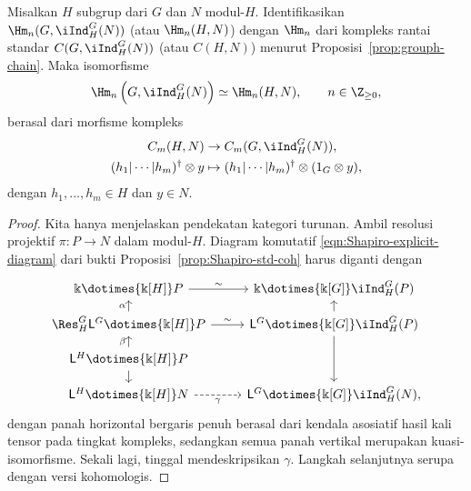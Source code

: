 \begin{proposition}\label{prop:Shapiro-std-ho}
	Misalkan $H$ subgrup dari $G$ dan $N$ modul-$H$. Identifikasikan
	$\Hm_n(G,\iInd^G_H(N))$ (atau $\Hm_n(H,N)$) dengan $\Hm_n$ dari kompleks
	rantai standar $C(G,\iInd^G_H(N))$ (atau $C(H,N)$) menurut
	Proposisi~\ref{prop:grouph-chain}. Maka isomorfisme
	\[ \Hm_n\left(G,\iInd^G_H(N)\right)\simeq\Hm_n(H,N),
	\qquad n\in\Z_{\geq0}, \]
	berasal dari morfisme kompleks
	\begin{align*}
		C_m(H,N)&\to C_m(G,\iInd^G_H(N)),\\
		(h_1|\cdots|h_m)^\dagger\otimes y
		&\mapsto(h_1|\cdots|h_m)^\dagger\otimes(1_G\otimes y),
	\end{align*}
	dengan $h_1,\ldots,h_m\in H$ dan $y\in N$.
\end{proposition}
\begin{proof}
	Kita hanya menjelaskan pendekatan kategori turunan. Ambil resolusi projektif
	$\pi:P\to N$ dalam modul-$H$. Diagram komutatif
	\eqref{eqn:Shapiro-explicit-diagram} dari bukti
	Proposisi~\ref{prop:Shapiro-std-coh} harus diganti dengan
	\[\begin{tikzcd}[row sep=small]
		\Bbbk\dotimes{\Bbbk[H]}P \arrow[r,"\sim"] &
		\Bbbk\dotimes{\Bbbk[G]}\iInd^G_H(P) \\
		\Res^G_H\mathsf{L}^G\dotimes{\Bbbk[H]}P
		\arrow[r,"\sim"] \arrow[u,"\alpha"] &
		\mathsf{L}^G\dotimes{\Bbbk[G]}\iInd^G_H(P)
		\arrow[u] \arrow[dd] \\
		\mathsf{L}^H\dotimes{\Bbbk[H]}P \arrow[u,"\beta"] \arrow[d] & \\
		\mathsf{L}^H\dotimes{\Bbbk[H]}N \arrow[dashed,r,"\gamma"'] &
		\mathsf{L}^G\dotimes{\Bbbk[G]}\iInd^G_H(N),
	\end{tikzcd}\]
	dengan panah horizontal bergaris penuh berasal dari kendala asosiatif hasil
	kali tensor pada tingkat kompleks, sedangkan semua panah vertikal merupakan
	kuasi-isomorfisme. Sekali lagi, tinggal mendeskripsikan $\gamma$.
	Langkah selanjutnya serupa dengan versi kohomologis.
\end{proof}
